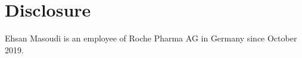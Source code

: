 \section*{Disclosure}
Ehsan Masoudi is an employee of Roche Pharma AG in Germany since October 2019.



\address{Ehsan Masoudi\\
      Department of Psychology, University of M{\"u}nster\\
      Fliednerstr. 21, 48149 Germany\\
      }

\address{Heinz Holling\\
    Department of Psychology, University of M{\"u}nster\\
    Fliednerstr. 21, 48149 Germany \\
  }
  
\address{Weng Kee Wong\\
    Department of Biostatistics \\
    UCLA Fielding School of Public Health\\
    Los Angeles, CA 90095-1772, USA \\
    }
    
\address{Seongho Kim\\
    Biostatistics Core, Karmanos Cancer Institute\\
    Department of Oncology, Wayne State University School of Medicine\\
    Detroit, MI 48201, USA \\
    }

